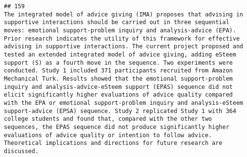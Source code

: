\documentclass[
  english,
  man]{apa6}
\begin{document}
\begin{verbatim}
## 159                                                                                                                                                                                                                                                                                                                                                                                                                                                                                                                                                                                                                                                                                                                                                                                                                                                                                                                                                                                                                                                                                                                                                                                                                                                                                                                                                                                                                                                                               The integrated model of advice giving (IMA) proposes that advising in supportive interactions should be carried out in three sequential moves: emotional support-problem inquiry and analysis-advice (EPA). Prior research indicates the utility of this framework for effective advising in supportive interactions. The current project proposed and tested an extended integrated model of advice giving, adding eSteem support (S) as a fourth move in the sequence. Two experiments were conducted. Study 1 included 371 participants recruited from Amazon Mechanical Turk. Results showed that the emotional support-problem inquiry and analysis-advice-eSteem support (EPAS) sequence did not elicit significantly higher evaluations of advice quality compared with the EPA or emotional support-problem inquiry and analysis-eSteem support-advice (EPSA) sequence. Study 2 replicated Study 1 with 364 college students and found that, compared with the other two sequences, the EPAS sequence did not produce significantly higher evaluations of advice quality or intention to follow advice. Theoretical implications and directions for future research are discussed.

\end{verbatim}
\end{document}
